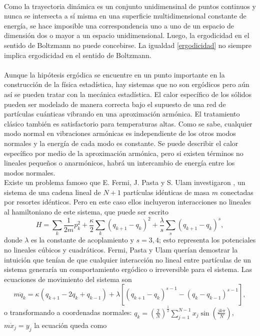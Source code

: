 \\ 
Como la trayectoria dinámica es un conjunto unidimensinal de puntos continuos y nunca se intersecta a sí misma en una superficie multidimensional constante de energía, se hace imposible una correspondencia uno a uno de un espacio de dimensión dos o mayor a un espacio unidimensional. Luego, la ergodicidad en el sentido de Boltzmann no puede concebirse. La igualdad \ref{ergodicidad} no siempre implica ergodicidad en el sentido de Boltzmann.
\\
\\
Aunque la hipótesis ergódica se encuentre en un punto importante en la construcción de la física estadística, hay sistemas que no son ergódicos pero aún así se pueden tratar con la mecánica estadística. El calor específico de los sólidos pueden ser modelado de manera correcta bajo el supuesto de una red de partículas cuánticas vibrando en una aproximación armónica.  El tratamiento clásico también es satisfactorio para temperaturas altas. Como se sabe, cualquier modo normal en vibraciones armónicas es independiente de los otros modos normales y la energía de cada modo es constante. Se puede describir el calor específico por medio de la aproximación armónica, pero si existen términos no lineales pequeños o anarmónicos, habrá un intercambio de energía entre los modos normales. 
\\
Existe un problema famoso que E. Fermi, J. Pasta y S. Ulam investigaron \cite{FermiPastaUlam}, un sistema de una cadena lineal de $N+1$ partículas idénticas de masa $m$ conectadas por resortes idénticos. Pero en este caso ellos incluyeron interacciones no lineales al hamiltoniano de este sistema, que puede ser escrito 
\begin{equation}
H= \sum_{k} \frac{1}{2m} p_{k}^{2} +\frac{\kappa}{2}\sum_{k} (q_{k+1}-q_{k})^{2}+\frac{\lambda}{s}\sum_{s} (q_{k+1}-q_{k})^{s},
\end{equation}
donde $\lambda$ es la constante de acoplamiento y $s=3,4$; esto representa los potenciales no lineales cúbicos y cuadráticos. Fermi, Pasta y Ulam querían demostrar la intuición que tenían de que cualquier interacción no lineal entre partículas de un sistema generaría un comportamiento ergódico o irreversible para el sistema. Las ecuaciones de movimiento del sistema son
\begin{equation}
m \ddot{q}_{k}= \kappa (q_{k+1}-2q_{k}+q_{k-1})+ \lambda[(q_{k+1}-q_{k})^{s-1}-(q_{k}-q_{k-1})^{s-1}],
\end{equation} 
o transformando a coordenadas normales: $q_{k}=(\frac{2}{N})^{\frac{1}{2}} \sum_{j=1}^{N-1}x_{j} \sin (\frac{jk \pi }{N})$, $m\dot{x}_{j}=y_{j}$ la ecuación queda como
